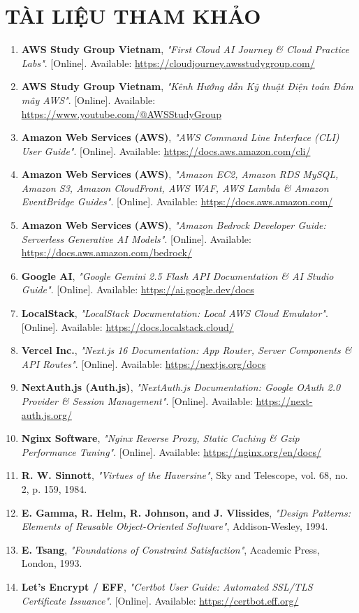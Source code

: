 \newpage
\section*{TÀI LIỆU THAM KHẢO}

\begin{enumerate}
    \item \textbf{AWS Study Group Vietnam}, \textit{"First Cloud AI Journey \& Cloud Practice Labs"}. [Online]. Available: \url{https://cloudjourney.awsstudygroup.com/}
    \item \textbf{AWS Study Group Vietnam}, \textit{"Kênh Hướng dẫn Kỹ thuật Điện toán Đám mây AWS"}. [Online]. Available: \url{https://www.youtube.com/@AWSStudyGroup}
    \item \textbf{Amazon Web Services (AWS)}, \textit{"AWS Command Line Interface (CLI) User Guide"}. [Online]. Available: \url{https://docs.aws.amazon.com/cli/}
    \item \textbf{Amazon Web Services (AWS)}, \textit{"Amazon EC2, Amazon RDS MySQL, Amazon S3, Amazon CloudFront, AWS WAF, AWS Lambda \& Amazon EventBridge Guides"}. [Online]. Available: \url{https://docs.aws.amazon.com/}
    \item \textbf{Amazon Web Services (AWS)}, \textit{"Amazon Bedrock Developer Guide: Serverless Generative AI Models"}. [Online]. Available: \url{https://docs.aws.amazon.com/bedrock/}
    \item \textbf{Google AI}, \textit{"Google Gemini 2.5 Flash API Documentation \& AI Studio Guide"}. [Online]. Available: \url{https://ai.google.dev/docs}
    \item \textbf{LocalStack}, \textit{"LocalStack Documentation: Local AWS Cloud Emulator"}. [Online]. Available: \url{https://docs.localstack.cloud/}
    \item \textbf{Vercel Inc.}, \textit{"Next.js 16 Documentation: App Router, Server Components \& API Routes"}. [Online]. Available: \url{https://nextjs.org/docs}
    \item \textbf{NextAuth.js (Auth.js)}, \textit{"NextAuth.js Documentation: Google OAuth 2.0 Provider \& Session Management"}. [Online]. Available: \url{https://next-auth.js.org/}
    \item \textbf{Nginx Software}, \textit{"Nginx Reverse Proxy, Static Caching \& Gzip Performance Tuning"}. [Online]. Available: \url{https://nginx.org/en/docs/}
    \item \textbf{R. W. Sinnott}, \textit{"Virtues of the Haversine"}, Sky and Telescope, vol. 68, no. 2, p. 159, 1984.
    \item \textbf{E. Gamma, R. Helm, R. Johnson, and J. Vlissides}, \textit{"Design Patterns: Elements of Reusable Object-Oriented Software"}, Addison-Wesley, 1994.
    \item \textbf{E. Tsang}, \textit{"Foundations of Constraint Satisfaction"}, Academic Press, London, 1993.
    \item \textbf{Let's Encrypt / EFF}, \textit{"Certbot User Guide: Automated SSL/TLS Certificate Issuance"}. [Online]. Available: \url{https://certbot.eff.org/}
\end{enumerate}
\clearpage
